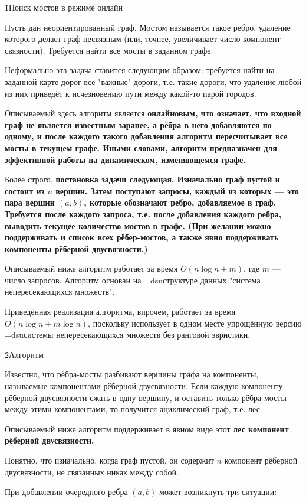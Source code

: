 \h1{Поиск мостов в режиме онлайн}

Пусть дан неориентированный граф. Мостом называется такое ребро, удаление которого делает граф несвязным (или, точнее, увеличивает число компонент связности). Требуется найти все мосты в заданном графе.

Неформально эта задача ставится следующим образом: требуется найти на заданной карте дорог все "важные" дороги, т.е. такие дороги, что удаление любой из них приведёт к исчезновению пути между какой-то парой городов.

Описываемый здесь алгоритм является \bf{онлайновым}, что означает, что входной граф не является известным заранее, а рёбра в него добавляются по одному, и после каждого такого добавления алгоритм пересчитывает все мосты в текущем графе. Иными словами, алгоритм предназначен для эффективной работы на динамическом, изменяющемся графе.

Более строго, \bf{постановка задачи} следующая. Изначально граф пустой и состоит из $n$ вершин. Затем поступают запросы, каждый из которых --- это пара вершин $(a,b)$, которые обозначают ребро, добавляемое в граф. Требуется после каждого запроса, т.е. после добавления каждого ребра, выводить текущее количество мостов в графе. (При желании можно поддерживать и список всех рёбер-мостов, а также явно поддерживать компоненты рёберной двусвязности.)

Описываемый ниже алгоритм работает за время $O (n \log n + m)$, где $m$ --- число запросов. Алгоритм основан на \algohref=dsu{структуре данных "система непересекающихся множеств"}.

Приведённая реализация алгоритма, впрочем, работает за время $O (n \log n + m \log n)$, поскольку использует в одном месте упрощённую версию \algohref=dsu{системы непересекающихся множеств} без ранговой эвристики.


\h2{Алгоритм}

Известно, что рёбра-мосты разбивают вершины графа на компоненты, называемые компонентами рёберной двусвязности. Если каждую компоненту рёберной двусвязности сжать в одну вершину, и оставить только рёбра-мосты между этими компонентами, то получится ациклический граф, т.е. лес.

Описываемый ниже алгоритм поддерживает в явном виде этот \bf{лес компонент рёберной двусвязности}.

Понятно, что изначально, когда граф пустой, он содержит $n$ компонент рёберной двусвязности, не связанных никак между собой.

При добавлении очередного ребра $(a,b)$ может возникнуть три ситуации:

